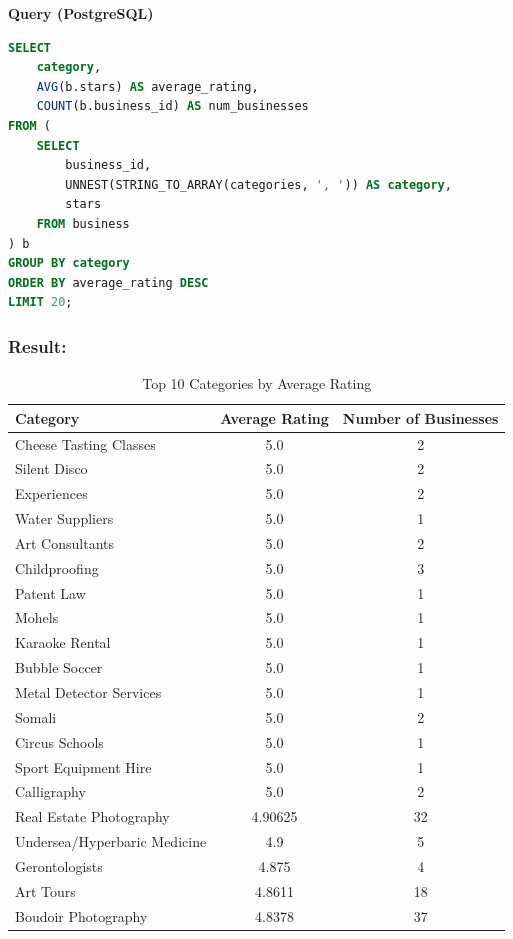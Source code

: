\documentclass[12pt]{article}
\begin{document}
\textbf{Query (PostgreSQL)}
\begin{lstlisting}[language=SQL, caption=Query to find top categories by average rating]
SELECT 
    category,
    AVG(b.stars) AS average_rating,
    COUNT(b.business_id) AS num_businesses
FROM (
    SELECT 
        business_id,
        UNNEST(STRING_TO_ARRAY(categories, ', ')) AS category,
        stars
    FROM business
) b
GROUP BY category
ORDER BY average_rating DESC
LIMIT 20;
\end{lstlisting}

\subsubsection*{Result:}
\begin{table}[h!]
\centering
\begin{tabular}{|l|c|c|}
\hline
\textbf{Category} & \textbf{Average Rating} & \textbf{Number of Businesses} \\
\hline
Cheese Tasting Classes & 5.0 & 2 \\
Silent Disco & 5.0 & 2 \\
Experiences & 5.0 & 2 \\
Water Suppliers & 5.0 & 1 \\
Art Consultants & 5.0 & 2 \\
Childproofing & 5.0 & 3 \\
Patent Law & 5.0 & 1 \\
Mohels & 5.0 & 1 \\
Karaoke Rental & 5.0 & 1 \\
Bubble Soccer & 5.0 & 1 \\
Metal Detector Services & 5.0 & 1 \\
Somali & 5.0 & 2 \\
Circus Schools & 5.0 & 1 \\
Sport Equipment Hire & 5.0 & 1 \\
Calligraphy & 5.0 & 2 \\
Real Estate Photography & 4.90625 & 32 \\
Undersea/Hyperbaric Medicine & 4.9 & 5 \\
Gerontologists & 4.875 & 4 \\
Art Tours & 4.8611 & 18 \\
Boudoir Photography & 4.8378 & 37 \\
\hline
\end{tabular}
\caption{Top 10 Categories by Average Rating}
\label{tab:top_categories}
\end{table}
\end{document}
